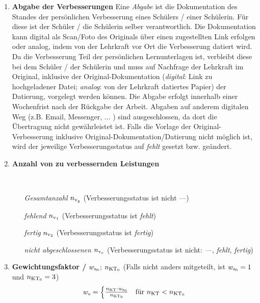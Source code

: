 \begin{enumerate}[label=\textbf{(\arabic*)}, align=left, leftmargin=*]
	\item \textbf{Abgabe der Verbesserungen} { \scriptsize Eine \glqq \textit{Abgabe}\grqq{} ist die Dokumentation des Standes der persönlichen Verbesserung eines Schülers / einer Schülerin. Für diese ist der Schüler / die Schülerin selber verantwortlich. Die Dokumentation kann digital als Scan/Foto des Originals über einen zugestellten Link erfolgen oder analog, indem von der Lehrkraft vor Ort die Verbesserung datiert wird. Da die Verbesserung Teil der persönlichen Lernunterlagen ist, verbleibt diese bei dem Schüler / der Schülerin und muss auf Nachfrage der Lehrkraft im Original, inklusive der Original-Dokumentation (\textit{digital}: Link zu hochgeladener Datei; \textit{analog}: von der Lehrkraft datiertes Papier) der Datierung, vorgelegt werden können. Die Abgabe erfolgt innerhalb einer Wochenfrist nach der Rückgabe der Arbeit. Abgaben auf anderem digitalen Weg (z.B. Email, Messenger, ... ) sind ausgeschlossen, da dort die Übertragung nicht gewährleistet ist. Falls die Vorlage der Original-Verbesserung inklusive Original-Dokumentation/Datierung nicht möglich ist, wird der jeweilige Verbesserungsstatus auf \glqq \textit{fehlt}\grqq{} gesetzt bzw. geändert.} 
	\item \textbf{Anzahl von zu verbessernden Leistungen} { \scriptsize \mbox{} \
	\setlength{\columnsep}{-20pt}
	\begin{multicols}{2}
	\begin{enumerate}[label=\textbf{\textbullet}, align=left, leftmargin=*]
		\item[\textit{Gesamtanzahl}] $n_{\mathrm{v}_\mathrm{g}}$ (Verbesserungsstatus ist nicht \glqq ---\grqq{})
		\item[\textit{fehlend}] $n_{\mathrm{v}_1}$ (Verbesserungsstatus ist \glqq \textit{fehlt}\grqq{})
		\item[\textit{fertig}] $n_{\mathrm{v}_2}$ (Verbesserungsstatus ist \glqq \textit{fertig}\grqq{})
		\item[\textit{nicht abgeschlossenen}] $n_{\mathrm{v}_\mathrm{o}}$ (Verbesserungsstatus ist nicht: \glqq\textit{---}\grqq{}, \glqq\textit{fehlt}\grqq{}, \glqq\textit{fertig}\grqq{})
	\end{enumerate}
	\end{multicols}
	}
	\vspace*{-12pt}
	\item \textbf{Gewichtungsfaktor /} $w_{\mathrm{s}_0}$; $n_{\mathrm{KT}_0}$  (Falls nicht anders mitgeteilt, ist $w_{\mathrm{s}_0}=1$ und $n_{\mathrm{KT}_0}=3$)
	\[
	w_{\mathrm{s}} =
	\begin{cases}
		\frac{n_{\mathrm{KT}} \cdot w_{\mathrm{s}_0}}{n_{\mathrm{KT}_0}} & \text{für }    n_{\mathrm{KT}} < n_{\mathrm{KT}_0} \\

\end{cases}\]
\end{enumerate}
